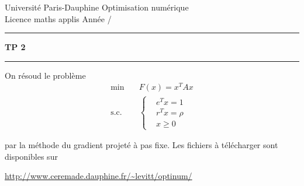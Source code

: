 \documentclass[10pt,a4paper,fleqn]{report}
\makeatletter
\def\cleardoublepage{\clearpage\if@twoside\ifodd\c@page\else\hbox{}\thispagestyle{empty}\newpage\fi\fi}
\makeatother
\begin{document}
\cleardoublepage

\noindent
Universit\'e Paris-Dauphine     \hfill      Optimisation num\'erique\\
Licence maths applis      \hfill      Ann\'ee /

\medskip

\hrule

\medskip



\begin{center}

\textbf{\huge TP 2}

\smallskip

\rule{10cm}{0.4pt}

\end{center}

On résoud le problème
\begin{align*}
  \text{min} \quad&F(x)=x^{T} A x\\
  \text{s.c.}\quad&\begin{cases}
    &e^{T} x = 1\\
  &r^{T} x = \rho\\
  &x \geq 0
  \end{cases}
\end{align*}

par la méthode du gradient projeté à pas fixe. Les fichiers à
télécharger sont disponibles sur

\url{http://www.ceremade.dauphine.fr/~levitt/optinum/}
\end{document}

